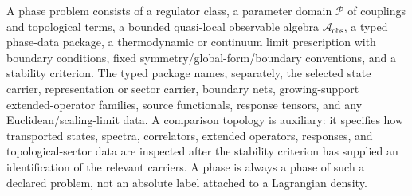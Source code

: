 \begin{definition}
\label{def:declared-phase-problem}
A phase problem consists of a regulator class, a parameter domain
\(\mathcal P\) of couplings and topological terms, a bounded quasi-local
observable algebra \(\mathcal A_{\mathrm{obs}}\), a typed phase-data package,
a thermodynamic or continuum limit prescription with boundary conditions, fixed
symmetry/global-form/boundary conventions, and a stability criterion.  The
typed package names, separately, the selected state carrier, representation or
sector carrier, boundary nets, growing-support extended-operator families,
source functionals, response tensors, and any Euclidean/scaling-limit data.
A comparison topology is auxiliary: it specifies how transported states,
spectra, correlators, extended operators, responses, and topological-sector
data are inspected after the stability criterion has supplied an
identification of the relevant carriers.
A phase is always a phase of such a declared problem, not an absolute label
attached to a Lagrangian density.
\end{definition}

